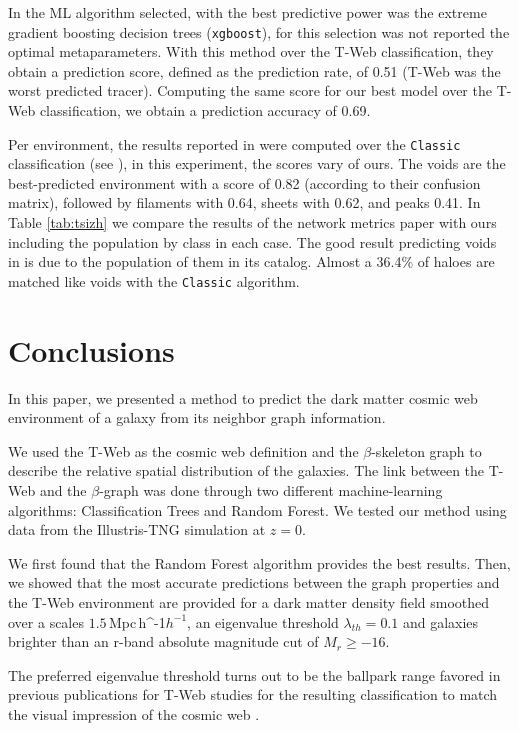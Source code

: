 \documentclass[usenatbib]{mnras}
\newcommand{\Mpch}{\,{\rm Mpc}\,\ifmmode h^{-1}\else $h^{-1}$\fi}
\begin{document}
In \citep{Tsizh2019} the ML algorithm selected, with the best
predictive power was the extreme gradient boosting decision trees (\texttt{xgboost}), for
this selection was not reported the optimal metaparameters. With this
method over the T-Web classification, they obtain a prediction score,
defined as the prediction rate, of 0.51 (T-Web was the worst predicted
tracer). Computing the same score for our best model over the T-Web
classification, we obtain a prediction accuracy of 0.69. 

Per environment, the results reported in \citep{Tsizh2019} were
computed over the \texttt{Classic} classification (see
\citep{Libeskind2018}), in this experiment, the scores vary of
ours. The voids are the best-predicted environment with a score of
0.82 (according to their confusion matrix), followed by filaments with
0.64, sheets with 0.62, and peaks 0.41. In Table \ref{tab:tsizh} we
compare the results of the network metrics paper with ours including
the population by class in each case. The good result predicting voids
in \citep{Tsizh2019} is due to the population of them in its
catalog. Almost a 36.4\% of haloes are matched like voids with the
\texttt{Classic} algorithm.  


\section{Conclusions}\label{sec:conclusions}

In this paper, we presented a method to predict the dark matter cosmic web environment of a galaxy from its neighbor graph information.

We used the T-Web as the cosmic web definition \citep{Forero-Romero2009} and the $\beta$-skeleton graph \citep{Fang2019} to describe the relative spatial distribution of the galaxies. 
The link between the T-Web and the $\beta$-graph was done through two different machine-learning algorithms: Classification Trees and Random Forest.
We tested our method using data from the Illustris-TNG simulation \citep{Nelson2019} at $z=0$. 

We first found that the Random Forest algorithm provides the best results. Then, we showed that the most accurate predictions between the graph properties and the T-Web environment are provided for a dark matter density field smoothed over a scales $1.5$\Mpch, an eigenvalue threshold $\lambda_{th}=0.1$ and galaxies brighter than an r-band absolute magnitude cut of $M_r\geq-16$. 

The preferred eigenvalue threshold turns out to be the ballpark range favored in previous publications for T-Web studies for the resulting classification to match the visual impression of the cosmic web \citep{Forero-Romero2009}.
\end{document}
